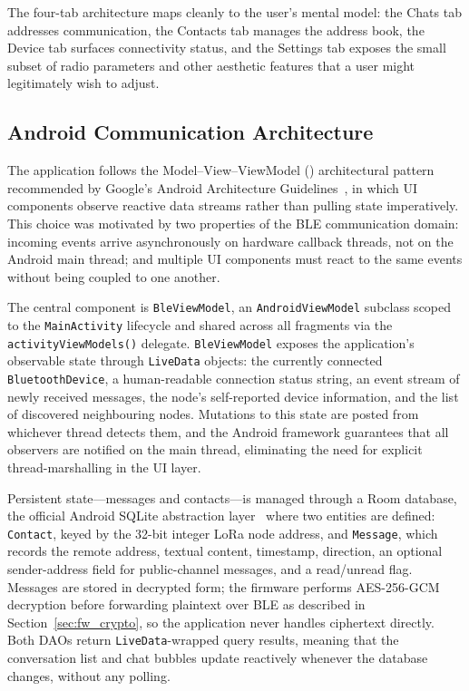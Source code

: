 \documentclass[english,bachelor]{tfgitic}[2026/01/22]
\begin{document}
The four-tab architecture maps cleanly to the user's mental model: the Chats tab addresses communication, the Contacts tab manages the address book, the Device tab surfaces connectivity status, and the Settings tab exposes the small subset of radio parameters and other aesthetic features that a user might legitimately wish to adjust.

\subsection{Android Communication Architecture}
\label{sec:app_architecture}

The application follows the Model--View--ViewModel () architectural pattern recommended by Google's Android Architecture Guidelines~\cite{google2024architecture}, in which UI components observe reactive data streams rather than pulling state imperatively. This choice was motivated by two properties of the BLE communication domain: incoming events arrive asynchronously on hardware callback threads, not on the Android main thread; and multiple UI components must react to the same events without being coupled to one another.

The central component is \texttt{BleViewModel}, an \texttt{AndroidViewModel} subclass scoped to the \texttt{MainActivity} lifecycle and shared across all fragments via the \texttt{activityViewModels()} delegate. \texttt{BleViewModel} exposes the application's observable state through \texttt{LiveData} objects: the currently connected \texttt{BluetoothDevice}, a human-readable connection status string, an event stream of newly received messages, the node's self-reported device information, and the list of discovered neighbouring nodes. Mutations to this state are posted from whichever thread detects them, and the Android framework guarantees that all observers are notified on the main thread, eliminating the need for explicit thread-marshalling in the UI layer.

Persistent state---messages and contacts---is managed through a Room database, the official Android SQLite abstraction layer~\cite{google2024room} where two entities are defined: \texttt{Contact}, keyed by the 32-bit integer LoRa node address, and \texttt{Message}, which records the remote address, textual content, timestamp, direction, an optional sender-address field for public-channel messages, and a read/unread flag. Messages are stored in decrypted form; the firmware performs AES-256-GCM decryption before forwarding plaintext over BLE as described in Section~\ref{sec:fw_crypto}, so the application never handles ciphertext directly. Both DAOs return \texttt{LiveData}-wrapped query results, meaning that the conversation list and chat bubbles update reactively whenever the database changes, without any polling.
\end{document}
